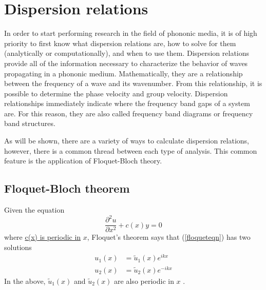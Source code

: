 \documentclass{article}
\begin{document}

\section{Dispersion relations}
In order to start performing research in the field of phononic media, it is of 
high priority to first know what dispersion relations are, how to solve for 
them (analytically or computationally), and when to use them. Dispersion 
relations provide all of the information necessary to characterize 
the behavior of waves propagating in a phononic medium. Mathematically, they 
are a relationship between the frequency of a wave and its wavenumber. From 
this relationship, it is possible to determine the phase velocity and group 
velocity. Dispersion relationships immediately indicate where the frequency 
band gaps of a system are. For this reason, they are also called frequency band 
diagrams or frequency band structures.

As will be shown, there are a variety of ways to calculate dispersion 
relations, however, there is a common thread between each type of analysis. 
This common feature is the application of Floquet-Bloch theory.

\subsection{Floquet-Bloch theorem} \label{fbt}
Given the equation
\begin{equation} \label{floqueteqn}
\frac{\partial^2 u}{\partial x^2} + c(x)y = 0
\end{equation}
where \underline{c(x) is periodic in} $x$, Floquet's theorem says that 
(\ref{floqueteqn}) has two solutions
\begin{align*}
u_1(x) &= \tilde{u}_1(x)e^{ikx} \\
u_2(x) &= \tilde{u}_2(x)e^{-ikx}
\end{align*}
In the above, $\tilde{u}_1(x)$ and $\tilde{u}_2(x)$ are also periodic in $x$ 
\cite{magnus79}.
\end{document}
